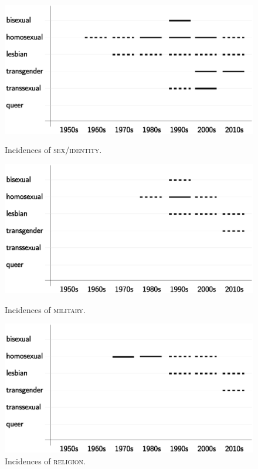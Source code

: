 \documentclass[10pt,a4paper,twocolumn]{scrartcl}
\begin{document}
\begin{figure}
\begin{minipage}{0.48\textwidth}
\includegraphics[width=\columnwidth]{figures/topic_identity}
\caption{Incidences of \textsc{sex/identity}.} \label{fig:topic_identity}

\includegraphics[width=\columnwidth]{figures/topic_military}
\caption{Incidences of \textsc{military}.} \label{fig:topic_military}
\end{minipage}
\hfill
\begin{minipage}{0.48\textwidth}
\includegraphics[width=\columnwidth]{figures/topic_religion}
\caption{Incidences of \textsc{religion}.} \label{fig:topic_religion}


\end{minipage}
\end{figure}
\end{document}
